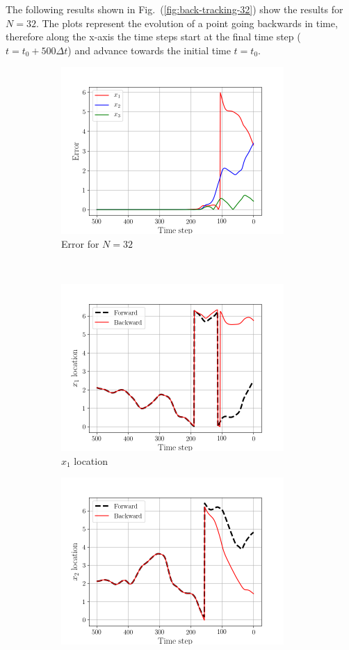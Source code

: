 \newpage
The following results shown in Fig.~(\ref{fig:back-tracking-32}) show the
results for $N=32$. The plots represent the evolution of a point going
backwards in time, therefore along the x-axis the time steps start at the
final time step ($t=t_{0} + 500 \Delta t$) and advance towards the initial
time $t=t_{0}$.  
\begin{figure}[H]
    \begin{subfigure}[H]{0.45\textwidth}
        \includegraphics[height=2.5in]{media/rk4/run-32/error-32.png}
        \caption{Error for $N=32$}
    \end{subfigure}
    ~
    \begin{subfigure}[H]{0.45\textwidth}
        \includegraphics[height=2.5in]{media/rk4/run-32/x1-32-tracking.png}
        \caption{$x_{1}$ location}
    \end{subfigure}
    \newline
    \begin{subfigure}[H]{0.45\textwidth}
        \includegraphics[height=2.5in]{media/rk4/run-32/x2-32-tracking.png}

\end{subfigure}
\end{figure}
